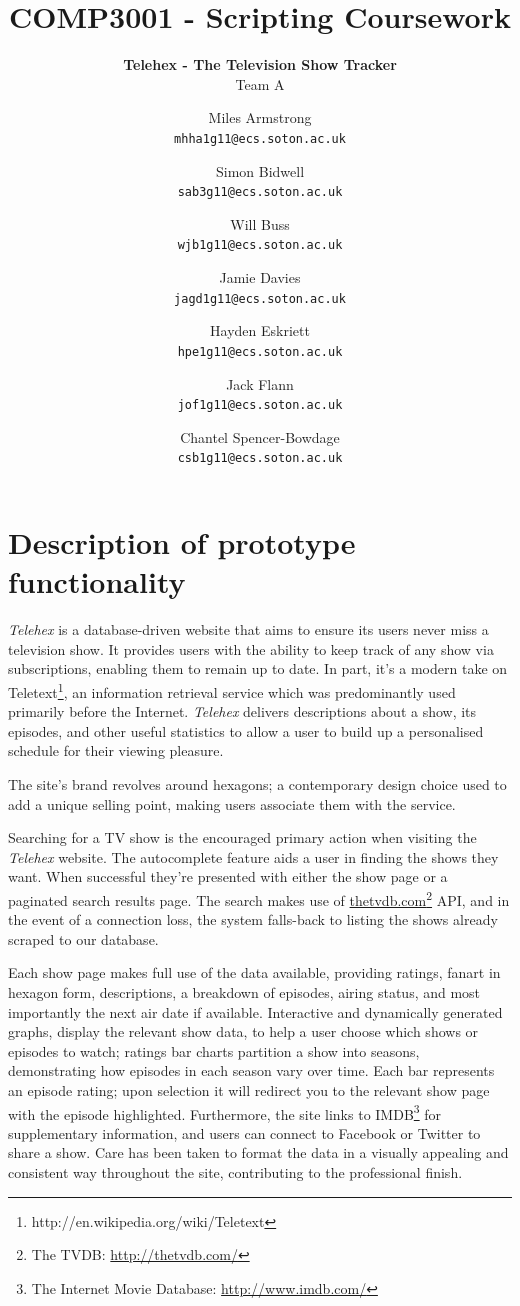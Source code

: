\documentclass[12pt, a4paper]{article}
\title{\Huge COMP3001 - Scripting Coursework}
\subtitle{\textbf{Telehex - The Television Show Tracker}\\[2em] \Large Team A}
\author{
  Miles Armstrong\\
  \texttt{mhha1g11@ecs.soton.ac.uk}
  \and 
  Simon Bidwell\\
  \texttt{sab3g11@ecs.soton.ac.uk}
  \and 
  Will Buss\\
  \texttt{wjb1g11@ecs.soton.ac.uk}
  \and  
  Jamie Davies\\
  \texttt{jagd1g11@ecs.soton.ac.uk}
  \and  
  Hayden Eskriett\\
  \texttt{hpe1g11@ecs.soton.ac.uk}
  \and
  Jack Flann\\
  \texttt{jof1g11@ecs.soton.ac.uk}
  \and
  Chantel Spencer-Bowdage\\
  \texttt{csb1g11@ecs.soton.ac.uk}\\[2em]
}
\begin{document}
{\color{white}
\clearpage\maketitle
\thispagestyle{empty}
}
\newpage
\section{Description of prototype functionality}

\textit{Telehex} is a database-driven website that aims to ensure its users never miss a television show. It provides users with the ability to keep track of any show via subscriptions, enabling them to remain up to date. In part, it's a modern take on Teletext\footnote{http://en.wikipedia.org/wiki/Teletext}, an information retrieval service which was predominantly used primarily before the Internet. \textit{Telehex} delivers descriptions about a show, its episodes, and other useful statistics to allow a user to build up a personalised schedule for their viewing pleasure. 

The site's brand revolves around hexagons; a contemporary design choice used to add a unique selling point, making users associate them with the service.  

Searching for a TV show is the encouraged primary action when visiting the \textit{Telehex} website. The autocomplete feature aids a user in finding the shows they want. When successful they're presented with either the show page or a paginated search results page. The search makes use of \href{http://thetvdb.com/}{thetvdb.com}\footnote{The TVDB: \href{http://thetvdb.com/}{http://thetvdb.com/}} API, and in the event of a connection loss, the system falls-back to listing the shows already scraped to our database.

Each show page makes full use of the data available, providing ratings, fanart in hexagon form, descriptions, a breakdown of episodes, airing status, and most importantly the next air date if available. Interactive and dynamically generated graphs, display the relevant show data, to help a user choose which shows or episodes to watch; ratings bar charts partition a show into seasons, demonstrating how episodes in each season vary over time. Each bar represents an episode rating; upon selection it will redirect you to the relevant show page with the episode highlighted. Furthermore, the site links to IMDB\footnote{The Internet Movie Database: \href{http://www.imdb.com/}{http://www.imdb.com/}} for supplementary information, and users can connect to Facebook or Twitter to share a show. Care has been taken to format the data in a visually appealing and consistent way throughout the site, contributing to the professional finish. 
\end{document}
